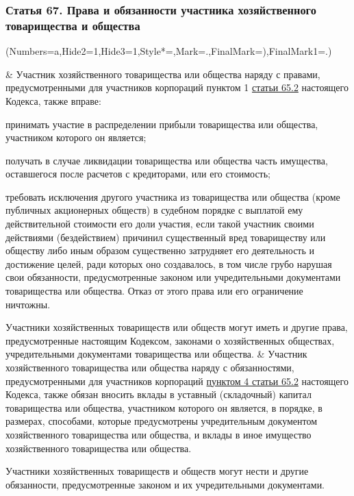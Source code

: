 \documentclass{report}
\newcommand{\beginEasyList}{
        \begin{easylist}[enumerate]
            \ListProperties(Numbers=a,Hide2=1,Hide3=1,Style*=,Mark=.,FinalMark={)},FinalMark1=.)
    }
\newcommand{\eEasyList}{\end{easylist}}
\begin{document}
\subsubsection{{\bf Статья 67.} Права и обязанности участника хозяйственного товарищества и общества}
\beginEasyList
    & Участник хозяйственного товарищества или общества наряду с правами, предусмотренными для участников корпораций пунктом 1 \ul{статьи 65.2} настоящего Кодекса, также вправе:
    \par принимать участие в распределении прибыли товарищества или общества, участником которого он является;
    \par получать в случае ликвидации товарищества или общества часть имущества, оставшегося после расчетов с кредиторами, или его стоимость;
    \par требовать исключения другого участника из товарищества или общества (кроме публичных акционерных обществ) в судебном порядке с выплатой ему действительной стоимости его доли участия, если такой участник своими действиями (бездействием) причинил существенный вред товариществу или обществу либо иным образом существенно затрудняет его деятельность и достижение целей, ради которых оно создавалось, в том числе грубо нарушая свои обязанности, предусмотренные законом или учредительными документами товарищества или общества. Отказ от этого права или его ограничение ничтожны.
    \par Участники хозяйственных товариществ или обществ могут иметь и другие права, предусмотренные настоящим Кодексом, законами о хозяйственных обществах, учредительными документами товарищества или общества.
    & Участник хозяйственного товарищества или общества наряду с обязанностями, предусмотренными для участников корпораций \ul{пунктом 4 статьи 65.2} настоящего Кодекса, также обязан вносить вклады в уставный (складочный) капитал товарищества или общества, участником которого он является, в порядке, в размерах, способами, которые предусмотрены учредительным документом хозяйственного товарищества или общества, и вклады в иное имущество хозяйственного товарищества или общества.
    \par Участники хозяйственных товариществ и обществ могут нести и другие обязанности, предусмотренные законом и их учредительными документами.
\eEasyList
\end{document}

